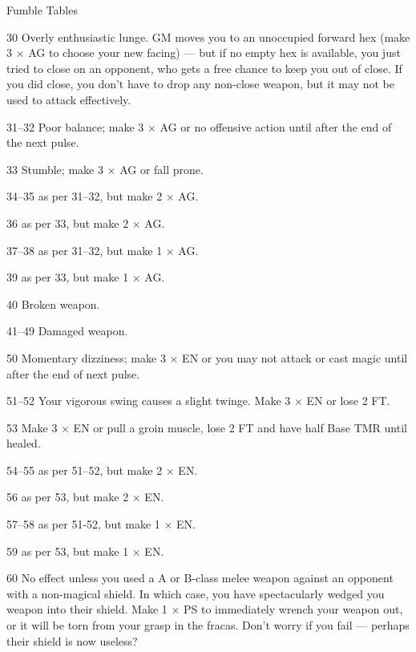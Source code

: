 \begin{Chapter}{Fumble Tables}
\begin{Description}
\item[30] Overly enthusiastic lunge. GM moves you to an unoccupied
  forward hex (make 3 × AG to choose your new facing) — but if no
  empty hex is available, you just tried to close on an opponent, who
  gets a free chance to keep you out of close. If you did close, you
  don’t have to drop any non-close weapon, but it may not be used to
  attack effectively.

\item[31–32] Poor balance; make 3 × AG or no offensive action until
  after the end of the next pulse.

\item[33] Stumble; make 3 × AG or fall prone.

\item[34–35] as per 31–32, but make 2 × AG.

\item[36] as per 33, but make 2 × AG.

\item[37–38] as per 31–32, but make 1 × AG.

\item[39] as per 33, but make 1 × AG.

\item[40] Broken weapon.

\item[41–49] Damaged weapon.

\item[50] Momentary dizziness; make 3 × EN or you may not attack or
  cast magic until after the end of next pulse.

\item[51–52] Your vigorous swing causes a slight twinge.  Make 3 × EN
  or lose 2 FT.

\item[53] Make 3 × EN or pull a groin muscle, lose 2 FT and have half
  Base TMR until healed.

\item[54–55] as per 51–52, but make 2 × EN.

\item[56] as per 53, but make 2 × EN.

\item[57–58] as per 51-52, but make 1 × EN.

\item[59] as per 53, but make 1 × EN.

\item[60] No effect unless you used a A or B-class melee weapon
  against an opponent with a non-magical shield. In which case, you
  have spectacularly wedged you weapon into their shield. Make 1 × PS
  to immediately wrench your weapon out, or it will be torn from your
  grasp in the fracas. Don’t worry if you fail — perhaps their shield
  is now useless?


\end{Description}
\end{Chapter}
